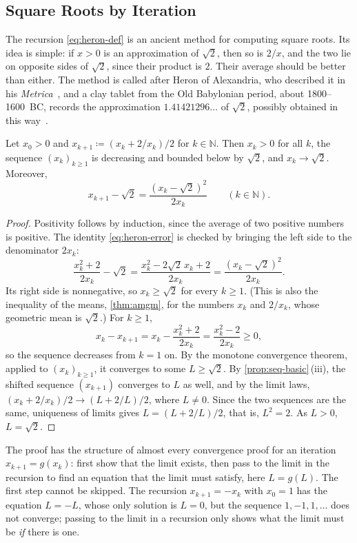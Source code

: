 \subsection{Square Roots by Iteration}

The recursion \eqref{eq:heron-def} is an ancient method for computing square roots. Its idea is simple: if $x>0$ is an approximation of $\sqrt2$, then so is $2/x$, and the two lie on opposite sides of $\sqrt2$, since their product is $2$. Their average should be better than either. The method is called  after Heron of Alexandria, who described it in his \emph{Metrica}~\cite{heath1921}, and a clay tablet from the Old Babylonian period, about 1800--1600~BC, records the approximation $1.41421296\ldots$ of $\sqrt2$, possibly obtained in this way~\cite{fowler1998}.

\begin{proposition}
\label{prop:heron}
Let $x_0>0$ and $x_{k+1}\coloneqq(x_k+2/x_k)/2$ for $k\in\mathbb N$. Then $x_k>0$ for all $k$, the sequence $(x_k)_{k\ge1}$ is decreasing and bounded below by $\sqrt2$, and $x_k\to\sqrt2$. Moreover,
\begin{equation}
x_{k+1}-\sqrt2=\frac{(x_k-\sqrt2)^2}{2x_k}\qquad(k\in\mathbb N).
\label{eq:heron-error}
\end{equation}
\end{proposition}

\begin{proof}
Positivity follows by induction, since the average of two positive numbers is positive. The identity \eqref{eq:heron-error} is checked by bringing the left side to the denominator $2x_k$:
\[
\frac{x_k^2+2}{2x_k}-\sqrt2=\frac{x_k^2-2\sqrt2\,x_k+2}{2x_k}=\frac{(x_k-\sqrt2)^2}{2x_k} .
\]
Its right side is nonnegative, so $x_k\ge\sqrt2$ for every $k\ge1$. (This is also the inequality of the means, \cref{thm:amgm}, for the numbers $x_k$ and $2/x_k$, whose geometric mean is $\sqrt2$.) For $k\ge1$,
\[
x_k-x_{k+1}=x_k-\frac{x_k^2+2}{2x_k}=\frac{x_k^2-2}{2x_k}\ge0 ,
\]
so the sequence decreases from $k=1$ on. By the monotone convergence theorem, applied to $(x_k)_{k\ge1}$, it converges to some $L\ge\sqrt2$. By \cref{prop:seq-basic}\,(iii), the shifted sequence $(x_{k+1})$ converges to $L$ as well, and by the limit laws, $(x_k+2/x_k)/2\to(L+2/L)/2$, where $L\ne0$. Since the two sequences are the same, uniqueness of limits gives $L=(L+2/L)/2$, that is, $L^2=2$. As $L>0$, $L=\sqrt2$.
\end{proof}

The proof has the structure of almost every convergence proof for an iteration $x_{k+1}=g(x_k)$: first show that the limit exists, then pass to the limit in the recursion to find an equation that the limit must satisfy, here $L=g(L)$. The first step cannot be skipped. The recursion $x_{k+1}=-x_k$ with $x_0=1$ has the equation $L=-L$, whose only solution is $L=0$, but the sequence $1,-1,1,\ldots$ does not converge; passing to the limit in a recursion only shows what the limit must be \emph{if} there is one.

